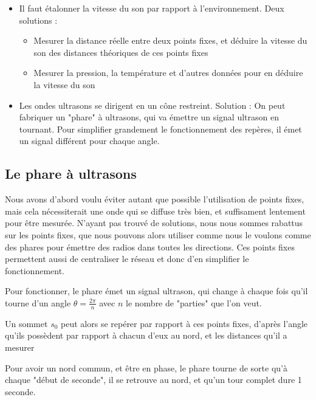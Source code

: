 \documentclass{article}
\begin{document}
\begin{itemize}
    \item Il faut étalonner la vitesse du son par rapport à l'environnement. Deux solutions :
    
    \begin{itemize}
        \item Mesurer la distance réelle entre deux points fixes, et déduire la vitesse du son des distances théoriques de ces points fixes
        \item Mesurer la pression, la température et d'autres données pour en déduire la vitesse du son
    \end{itemize}

    \item Les ondes ultrasons se dirigent en un cône restreint. Solution : On peut fabriquer un "phare" à ultrasons, qui va émettre un signal ultrason en tournant. Pour simplifier grandement le fonctionnement des repères, il émet un signal différent pour chaque angle.
\end{itemize}


\subsection{Le phare à ultrasons}


Nous avons d'abord voulu éviter autant que possible  l'utilisation de points fixes, mais cela nécessiterait une onde qui se diffuse très bien, et suffisament lentement pour être mesurée. N'ayant pas trouvé de solutions, nous nous sommes rabattus sur les points fixes, que nous pouvons alors utiliser comme nous le voulons comme des phares pour émettre des radios dans toutes les directions. Ces points fixes permettent aussi de centraliser le réseau et donc d'en simplifier le fonctionnement.

Pour fonctionner, le phare émet un signal ultrason, qui change à chaque fois qu'il tourne d'un angle $\theta=\frac{2\pi}{n}$ avec $n$ le nombre de "parties" que l'on veut.

Un sommet $s_0$ peut alors se repérer par rapport à ces points fixes, d'après l'angle qu'ils possèdent par rapport à chacun d'eux au nord, et les distances qu'il a mesurer

Pour avoir un nord commun, et être en phase, le phare tourne de sorte qu'à chaque "début de seconde", il se retrouve au nord, et qu'un tour complet dure 1 seconde.
\end{document}
